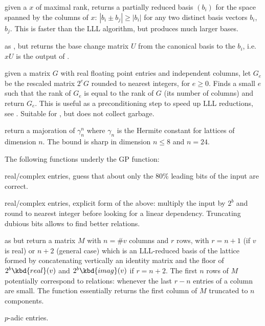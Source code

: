  given a  $x$ of maximal rank,
returns a partially reduced basis $(b_i)$ for the space spanned by the
columns of $x$: $|b_i \pm b_j| \geq |b_i|$ for any two distinct basis vectors
$b_i$, $b_j$. This is faster than the LLL algorithm, but produces much larger
bases.

 as , but returns
the base change matrix $U$ from the canonical basis to the $b_i$, i.e. $x U$
is the output of .

 given a matrix $G$ with real floating
point entries and independent columns, let $G_e$ be the
rescaled matrix $2^e G$ rounded to nearest integers, for $e \geq 0$.
Finds a small $e$ such that the rank of $G_e$ is equal to the rank of $G$
(its number of columns) and return $G_e$. This is useful as a preconditioning
step to speed up LLL reductions, see .
Suitable for , but does not collect garbage.

return a majoration of $\gamma_n^n$ where $\gamma_n$ is the
Hermite constant for lattices of dimension $n$. The bound is sharp in
dimension $n \leq 8$ and $n = 24$.


The following functions underly the  GP function:

 real/complex entries, guess that about only the
80\% leading bits of the input are correct.

 real/complex entries, explicit form of the
above: multiply the input by $2^b$ and round to nearest integer before
looking for a linear dependency. Truncating dubious bits allows to find
better relations.

 as  but return a
matrix $M$ with $n = \#v$ columns and $r$ rows, with $r = n+1$ (if $v$ is
real) or $n+2$ (general case) which is an LLL-reduced basis of the lattice
formed by concatenating vertically an identity matrix and the floor of $2^b
\kbd{real}(v)$ and $2^b \kbd{imag}(v)$ if $r = n+2$. The first $n$ rows of
$M$ potentially correspond to relations: whenever the last $r-n$ entries of a
column are small. The function  essentially returns the
first column of $M$ truncated to $n$ components.

 $p$-adic entries.

